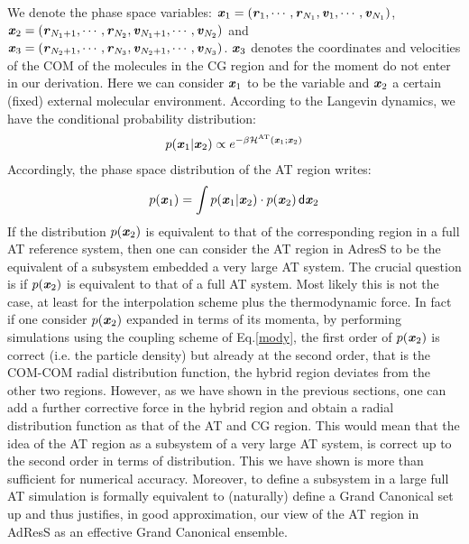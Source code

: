 \documentclass[aps,pre,preprint]{revtex4}
\renewcommand{\v}[1]{\textbf{\textit{#1}}}
\renewcommand{\d}[1]{\textsf{#1}}
\begin{document}
We denote the phase space variables: $\v x_1 = (\v r_1, \cdots, \v
r_{N_1}, \v v_1, \cdots, \v v_{N_1})$,  $\v x_2 = (\v r_{N_1+1},
\cdots, \v r_{N_2}, \v v_{N_1+1}, \cdots, \v v_{N_2})$ and
$\v x_3 = (\v r_{N_2+1},
\cdots, \v r_{N_3}, \v v_{N_2+1}, \cdots, \v v_{N_3})$. $\v x_{3}$ denotes the coordinates and velocities of the COM of the molecules in the CG region and for the moment do not enter in our derivation.
Here we can consider $\v x_1$ to be the variable and $\v x_2$ a certain (fixed) external molecular environment. 
According to the Langevin dynamics, we have the conditional probability distribution:
\begin{align}
  p (\v x_1 \vert \v x_2)  \propto
  e^{-\beta \mathcal H^{\textrm{AT}}(\v x_1; \v x_2)}
\end{align}
Accordingly, the phase space distribution of the AT region writes:
\begin{align}
  p(\v x_1) = \int p(\v x_1\vert\v x_2)\cdot p (\v x_2) \,\d d\v x_2
\end{align}
If the distribution $p(\v x_2)$ is equivalent to that of the corresponding region in a full AT reference system, then one can consider the AT region in AdresS to be the equivalent of a subsystem embedded  a very large AT
system.
The crucial question is if $p(\v x_2)$ is equivalent to that of a full AT system. 
Most likely this is not the case, at least for the interpolation scheme plus the thermodynamic force. In fact if one consider $p(\v x_2)$ expanded in terms of its momenta, by performing simulations using the coupling scheme of Eq.\ref{mody}, the first order of $p(\v x_2)$ is correct (i.e. the particle density) but already at the second order, that is the COM-COM radial distribution function, the hybrid region deviates from the other two regions. However, as we have shown in the previous sections, one can add a further corrective force in the hybrid region
and obtain a radial distribution function as that of the AT and CG region. This would mean that the idea of the AT region as a subsystem of a very large AT system, is correct up to the second order in terms of distribution. This we have shown is more than sufficient for numerical accuracy. Moreover, to define a subsystem in a large full AT simulation is formally equivalent to (naturally) define a Grand Canonical set up and thus justifies, in good approximation, our view of the AT region in AdResS as an effective Grand Canonical ensemble.  
\end{document}
